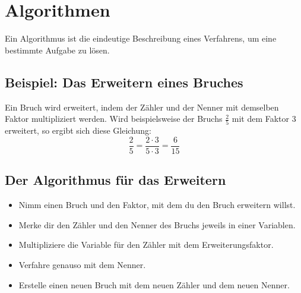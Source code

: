 \section{Algorithmen}
\label{sec:Algorithmus}

Ein Algorithmus ist die eindeutige Beschreibung eines Verfahrens, um eine bestimmte Aufgabe zu lösen.

\subsection*{Beispiel: Das Erweitern eines Bruches}

Ein Bruch wird erweitert, indem der Zähler und der Nenner mit demselben Faktor multipliziert werden. Wird beispielsweise der Bruchs $\frac{2}{5}$ mit dem Faktor $3$ erweitert, so ergibt sich diese Gleichung:
\[
\frac{2}{5} = \frac{2 \cdot 3}{5 \cdot 3} = \frac{6}{15}
\]

\subsection*{Der Algorithmus für das Erweitern}

\begin{itemize}
	\item Nimm einen Bruch und den Faktor, mit dem du den Bruch erweitern willst.
	\item Merke dir den Zähler und den Nenner des Bruchs jeweils in einer Variablen.
	\item Multipliziere die Variable für den Zähler mit dem Erweiterungsfaktor.
	\item Verfahre genauso mit dem Nenner.
	\item Erstelle einen neuen Bruch mit dem neuen Zähler und dem neuen Nenner.
\end{itemize}